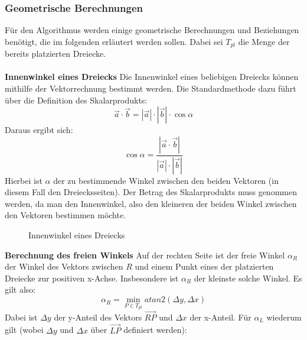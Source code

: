 \documentclass[a4paper, notitlepage, 12pt,headinclude]{scrartcl}
\begin{document}
\subsubsection{Geometrische Berechnungen}
Für den Algorithmus werden einige geometrische Berechnungen und Beziehungen benötigt, die im folgenden erläutert werden sollen. Dabei sei $T_{pl}$ die Menge der bereits platzierten Dreiecke. \\ \\
\textbf{Innenwinkel eines Dreiecks} \quad Die Innenwinkel eines beliebigen Dreiecks können mithilfe der Vektorrechnung bestimmt werden. Die Standardmethode dazu führt über die Definition des Skalarprodukts:
\begin{equation}
\vec{a} \cdot \vec{b} = |\vec{a}| \cdot |\vec{b}| \cdot \cos \alpha
\end{equation}
Daraus ergibt sich:
\begin{equation}
\cos \alpha = \frac{|\vec{a} \cdot \vec{b}|}{|\vec{a}| \cdot |\vec{b}|}
\end{equation}
Hierbei ist $\alpha$ der zu bestimmende Winkel zwischen den beiden Vektoren (in diesem Fall den Dreiecksseiten). Der Betrag des Skalarprodukts muss genommen werden, da man den Innenwinkel, also den kleineren der beiden Winkel zwischen den Vektoren bestimmen möchte.
\begin{figure}[H]
\centering {}
\caption{Innenwinkel eines Dreiecks}
\end{figure}
\textbf{Berechnung des freien Winkels} \quad Auf der rechten Seite ist der freie Winkel $\alpha_R$ der Winkel des Vektors zwischen $R$ und einem Punkt eines der platzierten Dreiecke zur positiven x-Achse. Insbesondere ist $\alpha_R$ der kleinste solche Winkel. Es gilt also:
\begin{equation}
\alpha_R = \min_{P \in T_{pl}} atan2(\Delta y, \Delta x)
\end{equation}
Dabei ist $\Delta y$ der y-Anteil des Vektors $\overrightarrow{RP}$ und $\Delta x$ der x-Anteil. Für $\alpha_L$ wiederum gilt (wobei $\Delta y$ und $\Delta x$ über $\overrightarrow{LP}$ definiert werden):
\end{document}
